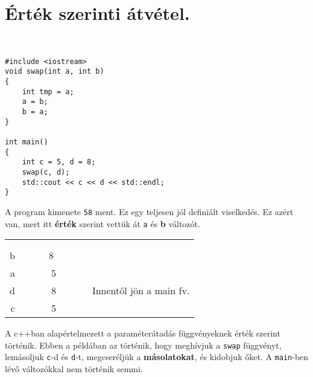 \documentclass[a4paper,11.5pt]{article}
\begin{document}
	\section{Érték szerinti átvétel.}
	\begin{example}\
		
		\begin{lstlisting}
#include <iostream>
void swap(int a, int b)
{
	int tmp = a;
	a = b;
	b = a;
}

int main()
{
	int c = 5, d = 8;
	swap(c, d);
	std::cout << c << d << std::endl;
}
		\end{lstlisting}	
		A program kimenete \texttt{58} ment. Ez egy teljesen jól definiált viselkedés. Ez azért van, mert itt \textbf{érték} szerint vettük át \texttt{a} és \textbf{b} változót.
		\begin{center}
			\begin{tabular}{r|c|l}
				&&\\
				&&\\
				\cline{2-2}
				b&~~~~~8~~~~~~&\\
				\cline{2-2}
				a&5&\\
				\cline{2-2}
				d&8& Innentől jön a main fv.\\
				\cline{2-2}
				c&5&\\
				\cline{2-2}
			\end{tabular}
		\end{center}
		A c++ban alapértelmezett a paraméterátadás függvényeknek érték szerint történik. Ebben a példában az történik, hogy meghívjuk a \texttt{swap} függvényt, lemásoljuk \texttt{c}-d és \texttt{d}-t, megcseréljük a \textbf{másolatokat}, és kidobjuk őket. A \texttt{main}-ben lévő változókkal nem történik semmi.
	\end{example}
\end{document}

